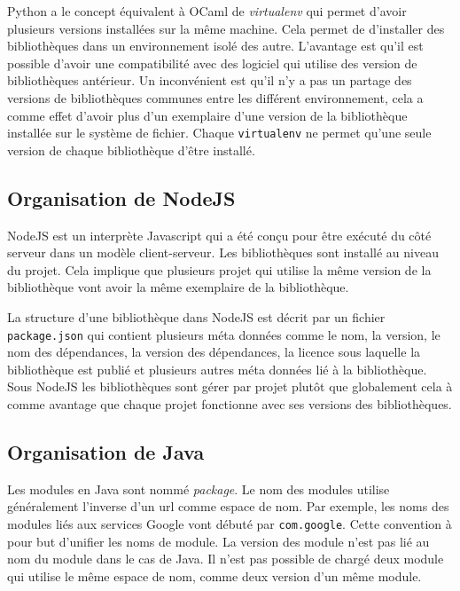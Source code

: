 Python a le concept équivalent à OCaml de \textit{virtualenv} qui permet d'avoir plusieurs
versions installées sur la même machine. Cela permet de d'installer des
bibliothèques dans un environnement isolé des autre. L'avantage est qu'il est
possible d'avoir une compatibilité avec des logiciel qui utilise des version de
bibliothèques antérieur. Un inconvénient est qu'il n'y a pas un partage des
versions de bibliothèques communes entre les différent environnement, cela a
comme effet d'avoir plus d'un exemplaire d'une version de la bibliothèque installée
sur le système de fichier. Chaque \texttt{virtualenv} ne permet qu'une seule version de
chaque bibliothèque d'être installé.


\subsection{Organisation de NodeJS}
NodeJS est un interprète Javascript qui a été conçu pour être exécuté
du côté serveur dans un modèle client-serveur. Les bibliothèques sont
installé au niveau du projet. Cela implique que plusieurs projet qui
utilise la même version de la bibliothèque vont avoir la même exemplaire
de la bibliothèque.

La structure d'une bibliothèque dans NodeJS est décrit par un fichier
\texttt{package.json} qui contient plusieurs méta données comme
le nom, la version, le nom des dépendances, la version des dépendances,
la licence sous laquelle la bibliothèque est publié et plusieurs autres
méta données lié à la bibliothèque. Sous NodeJS les bibliothèques sont gérer
par projet plutôt que globalement cela à comme avantage que chaque projet
fonctionne avec ses versions des bibliothèques.

\subsection{Organisation de Java}
%
Les modules en Java sont nommé \textit{package}.  Le nom des modules utilise
généralement l'inverse d'un url comme espace de nom. Par exemple, les noms des
modules liés aux services Google vont débuté par \texttt{com.google}. Cette
convention à pour but d'unifier les noms de module. La version des module n'est
pas lié au nom du module dans le cas de Java. Il n'est pas possible de chargé
deux module qui utilise le même espace de nom, comme deux version d'un même module.

